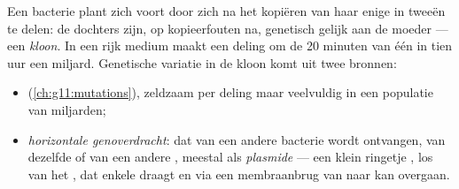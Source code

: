 \begin{proposition}\label{prop:g11:antibiotic-resistance:variation}
Een bacterie plant zich voort door zich na het kopiëren van haar enige
 in tweeën te delen: de dochters zijn, op kopieerfouten na,
genetisch gelijk aan de moeder --- een \emph{kloon}. In een rijk medium
maakt een deling om de 20 minuten van één  in tien uur een miljard.
Genetische variatie in de kloon komt uit twee bronnen:
\begin{itemize}
  \item \emph{} (\cref{ch:g11:mutations}), zeldzaam per deling
        maar veelvuldig in een populatie van miljarden;
  \item \emph{horizontale genoverdracht}:
         dat van een andere bacterie wordt ontvangen, van dezelfde of
        van een andere , meestal als \emph{plasmide} --- een klein
        ringetje , los van het , dat enkele  draagt en
        via een membraanbrug van  naar  kan overgaan.
\end{itemize}
\end{proposition}
\admitted

